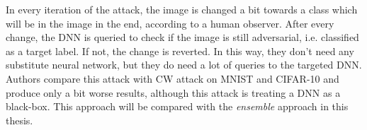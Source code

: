 In every iteration of the attack, the image is changed a bit towards a class which will be in the image in the end, according to a human observer. After every change, the DNN is queried to check if the image is still adversarial, i.e. classified as a target label. If not, the change is reverted. In this way, they don't need any substitute neural network, but they do need a lot of queries to the targeted DNN. Authors compare this attack with CW attack on MNIST and CIFAR-10 and produce only a bit worse results, although this attack is treating a DNN as a black-box. This approach will be compared with the \textit{ensemble} approach in this thesis.

